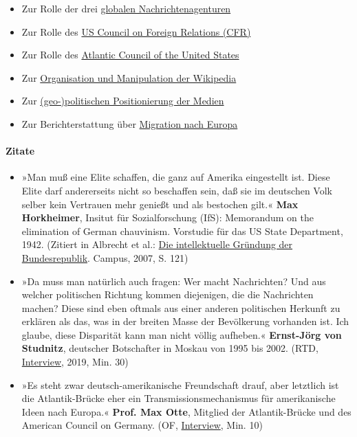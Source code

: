 \begin{itemize}
\tightlist
\item
  Zur Rolle der drei
  \href{https://swprs.org/der-propaganda-multiplikator/}{globalen
  Nachrichtenagenturen}
\item
  Zur Rolle des \href{https://swprs.org/die-propaganda-matrix/}{US
  Council on Foreign Relations (CFR)}
\item
  Zur Rolle des \href{https://swprs.org/atlantic-council/}{Atlantic
  Council of the United States}
\item
  Zur \href{https://swprs.org/propaganda-in-der-wikipedia/}{Organisation
  und Manipulation der Wikipedia}
\item
  Zur \href{https://swprs.org/medien-navigator/}{(geo-)politischen
  Positionierung der Medien}
\item
  Zur Berichterstattung über
  \href{https://swprs.org/migration-und-medien/}{Migration nach Europa}
\end{itemize}

\hypertarget{zitate}{%
\paragraph{Zitate}\label{zitate}}

\begin{itemize}
\tightlist
\item
  »Man muß eine Elite schaffen, die ganz auf Amerika eingestellt ist.
  Diese Elite darf andererseits nicht so beschaffen sein, daß sie im
  deutschen Volk selber kein Vertrauen mehr genießt und als bestochen
  gilt.« \textbf{Max Horkheimer}, Insitut für Sozialforschung (IfS):
  Memorandum on the elimination of German chauvinism. Vorstudie für das
  US State Department, 1942. (Zitiert in Albrecht et al.:
  \href{https://www.campus.de/buecher-campus-verlag/wissenschaft/geschichte/die_intellektuelle_gruendung_der_bundesrepublik-3146.html}{Die
  intellektuelle Gründung der Bundesrepublik}. Campus, 2007, S. 121)
\item
  »Da muss man natürlich auch fragen: Wer macht Nachrichten? Und aus
  welcher politischen Richtung kommen diejenigen, die die Nachrichten
  machen? Diese sind eben oftmals aus einer anderen politischen Herkunft
  zu erklären als das, was in der breiten Masse der Bevölkerung
  vorhanden ist. Ich glaube, diese Disparität kann man nicht völlig
  aufheben.« \textbf{Ernst-Jörg von Studnitz}, deutscher Botschafter in
  Moskau von 1995 bis 2002. (RTD,
  \href{https://deutsch.rt.com/europa/86144-in-konfrontation-zwischen-amerika-und/}{Interview},
  2019, Min. 30)
\item
  »Es steht zwar deutsch-amerikanische Freundschaft drauf, aber
  letztlich ist die Atlantik-Brücke eher ein Trans­missions­mecha­nismus
  für amerikanische Ideen nach Europa.« \textbf{Prof. Max Otte},
  Mitglied der Atlantik-Brücke und des American Council on Germany. (OF,
  \href{https://www.youtube.com/watch?v=9Ouns9KhQFQ}{Interview}, Min.
  10)
\end{itemize}

